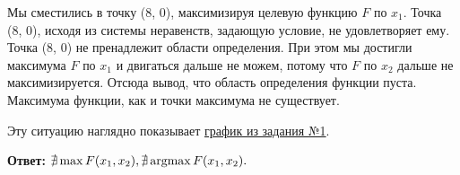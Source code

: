 Мы сместились в точку (8, 0), максимизируя целевую функцию $F$ по $x_1$.
Точка (8, 0), исходя из системы неравенств, задающую условие, не удовлетворяет ему. 
Точка (8, 0) не пренадлежит области определения. При этом мы достигли максимума $F$ по $x_1$ и двигаться дальше не можем,
потому что $F$ по $x_2$ дальше не максимизируется.
Отсюда вывод, что область определения функции пуста. Максимума функции, как и точки максимума не существует.

Эту ситуацию наглядно показывает \hyperref[01-lab-03-graphic]{график из задания №1}.

\textbf{Ответ:} $\nexists\max F(x_1, x_2), \nexists\operatorname*{argmax} F(x_1, x_2).$ \label{02-lab-c-answer}

\newpage